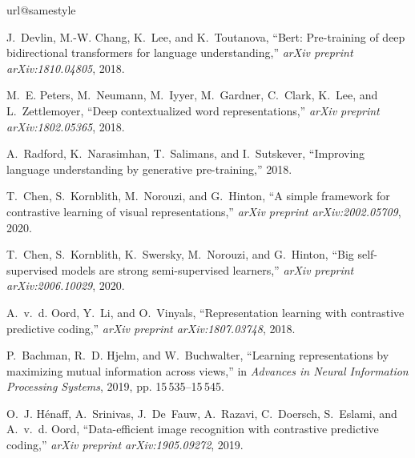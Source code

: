 \documentclass[a4paper]{article}
\begin{document}
\begin{thebibliography}{10}
\providecommand{\url}[1]{#1}
\csname url@samestyle\endcsname
\providecommand{\newblock}{\relax}
\providecommand{\bibinfo}[2]{#2}
\providecommand{\BIBentrySTDinterwordspacing}{\spaceskip=0pt\relax}
\providecommand{\BIBentryALTinterwordstretchfactor}{4}
\providecommand{\BIBentryALTinterwordspacing}{\spaceskip=\fontdimen2\font plus
\BIBentryALTinterwordstretchfactor\fontdimen3\font minus
  \fontdimen4\font\relax}
\providecommand{\BIBforeignlanguage}[2]{{\expandafter\ifx\csname l@#1\endcsname\relax
\typeout{** WARNING: IEEEtran.bst: No hyphenation pattern has been}\typeout{** loaded for the language `#1'. Using the pattern for}\typeout{** the default language instead.}\else
\language=\csname l@#1\endcsname
\fi
#2}}
\providecommand{\BIBdecl}{\relax}
\BIBdecl

J.~Devlin, M.-W. Chang, K.~Lee, and K.~Toutanova, ``Bert: Pre-training of deep
  bidirectional transformers for language understanding,'' \emph{arXiv preprint
  arXiv:1810.04805}, 2018.

M.~E. Peters, M.~Neumann, M.~Iyyer, M.~Gardner, C.~Clark, K.~Lee, and
  L.~Zettlemoyer, ``Deep contextualized word representations,'' \emph{arXiv
  preprint arXiv:1802.05365}, 2018.

A.~Radford, K.~Narasimhan, T.~Salimans, and I.~Sutskever, ``Improving language
  understanding by generative pre-training,'' 2018.

T.~Chen, S.~Kornblith, M.~Norouzi, and G.~Hinton, ``A simple framework for
  contrastive learning of visual representations,'' \emph{arXiv preprint
  arXiv:2002.05709}, 2020.

T.~Chen, S.~Kornblith, K.~Swersky, M.~Norouzi, and G.~Hinton, ``Big
  self-supervised models are strong semi-supervised learners,'' \emph{arXiv
  preprint arXiv:2006.10029}, 2020.

A.~v.~d. Oord, Y.~Li, and O.~Vinyals, ``Representation learning with
  contrastive predictive coding,'' \emph{arXiv preprint arXiv:1807.03748},
  2018.

P.~Bachman, R.~D. Hjelm, and W.~Buchwalter, ``Learning representations by
  maximizing mutual information across views,'' in \emph{Advances in Neural
  Information Processing Systems}, 2019, pp. 15\,535--15\,545.

O.~J. H{\'e}naff, A.~Srinivas, J.~De~Fauw, A.~Razavi, C.~Doersch, S.~Eslami,
  and A.~v.~d. Oord, ``Data-efficient image recognition with contrastive
  predictive coding,'' \emph{arXiv preprint arXiv:1905.09272}, 2019.


\end{thebibliography}
\end{document}

